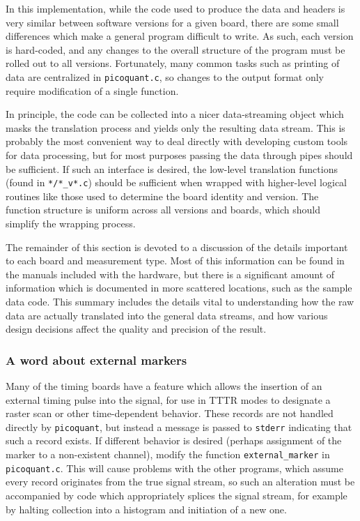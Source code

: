 \documentclass{article}
\newcommand{\stderr}{\texttt{stderr}}
\newcommand{\picoquant}{\texttt{picoquant}}
\begin{document}
In this implementation, while the code used to produce the data and headers is very similar between software versions for a given board, there are some small differences which make a general program difficult to write. As such, each version is hard-coded, and any changes to the overall structure of the program must be rolled out to all versions. Fortunately, many common tasks such as printing of data are centralized in \texttt{picoquant.c}, so changes to the output format only require modification of a single function.

In principle, the code can be collected into a nicer data-streaming object which masks the translation process and yields only the resulting data stream. This is probably the most convenient way to deal directly with developing custom tools for data processing, but for most purposes passing the data through pipes should be sufficient. If such an interface is desired, the low-level translation functions (found in \texttt{*/*\_v*.c}) should be sufficient when wrapped with higher-level logical routines like those used to determine the board identity and version. The function structure is uniform across all versions and boards, which should simplify the wrapping process.

The remainder of this section is devoted to a discussion of the details important to each board and measurement type. Most of this information can be found in the manuals included with the hardware, but there is a significant amount of information which is documented in more scattered locations, such as the sample data code. This summary includes the details vital to understanding how the raw data are actually translated into the general data streams, and how various design decisions affect the quality and precision of the result.

\subsubsection{A word about external markers}
Many of the timing boards have a feature which allows the insertion of an external timing pulse into the signal, for use in TTTR modes to designate a raster scan or other time-dependent behavior. These records are not handled directly by \picoquant, but instead a message is passed to \stderr{} indicating that such a record exists. If different behavior is desired (perhaps assignment of the marker to a non-existent channel), modify the function \texttt{external\_marker} in \texttt{picoquant.c}. This will cause problems with the other programs, which assume every record originates from the true signal stream, so such an alteration must be accompanied by code which appropriately splices the signal stream, for example by halting collection into a histogram and initiation of a new one.
\end{document}
